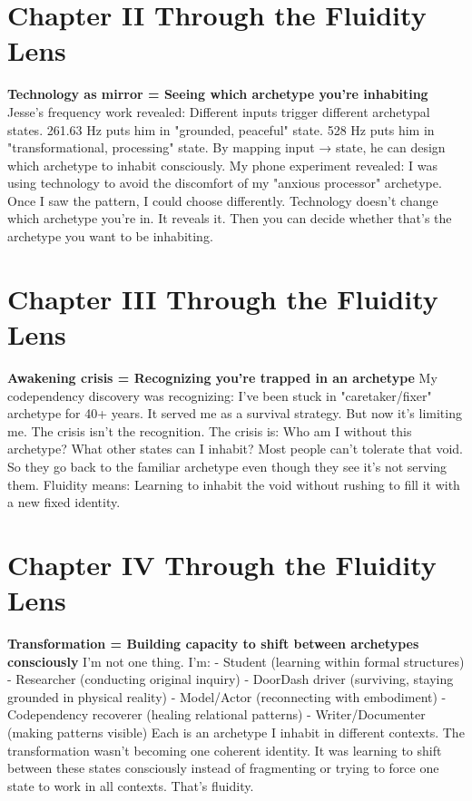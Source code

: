 \section{Chapter II Through the Fluidity Lens}

\textbf{Technology as mirror = Seeing which archetype you're inhabiting}
Jesse's frequency work revealed: Different inputs trigger different archetypal states. 261.63 Hz puts him in "grounded, peaceful" state. 528 Hz puts him in "transformational, processing" state.
By mapping input → state, he can design which archetype to inhabit consciously.
My phone experiment revealed: I was using technology to avoid the discomfort of my "anxious processor" archetype. Once I saw the pattern, I could choose differently.
Technology doesn't change which archetype you're in. It reveals it. Then you can decide whether that's the archetype you want to be inhabiting.

\section{Chapter III Through the Fluidity Lens}

\textbf{Awakening crisis = Recognizing you're trapped in an archetype}
My codependency discovery was recognizing: I've been stuck in "caretaker/fixer" archetype for 40+ years. It served me as a survival strategy. But now it's limiting me.
The crisis isn't the recognition. The crisis is: Who am I without this archetype? What other states can I inhabit?
Most people can't tolerate that void. So they go back to the familiar archetype even though they see it's not serving them.
Fluidity means: Learning to inhabit the void without rushing to fill it with a new fixed identity.

\section{Chapter IV Through the Fluidity Lens}

\textbf{Transformation = Building capacity to shift between archetypes consciously}
I'm not one thing. I'm:
- Student (learning within formal structures)
- Researcher (conducting original inquiry)
- DoorDash driver (surviving, staying grounded in physical reality)
- Model/Actor (reconnecting with embodiment)
- Codependency recoverer (healing relational patterns)
- Writer/Documenter (making patterns visible)
Each is an archetype I inhabit in different contexts.
The transformation wasn't becoming one coherent identity. It was learning to shift between these states consciously instead of fragmenting or trying to force one state to work in all contexts.
That's fluidity.

